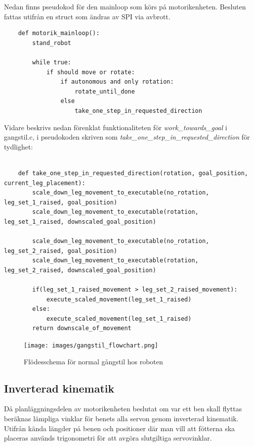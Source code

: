 \documentclass[a4paper,titlepage,12pt]{article}
\begin{document}
    	Nedan finns pseudokod för den mainloop som körs på motorikenheten. Besluten fattas utifrån en 
	struct som ändras av SPI via avbrott.

	\begin{lstlisting}
	def motorik_mainloop():
        stand_robot

        while true:
            if should move or rotate:
                if autonomous and only rotation:
                    rotate_until_done
                else
                    take_one_step_in_requested_direction
	\end{lstlisting}
	
    Vidare beskrivs nedan förenklat funktionaliteten för
    \textit{work\_towards\_goal} i gangstil.c, i pseudokoden skriven 
    som \textit{take\_one\_step\_in\_requested\_direction} för tydlighet:

	\begin{lstlisting}
	
	def take_one_step_in_requested_direction(rotation, goal_position, current_leg_placement):
		scale_down_leg_movement_to_executable(no_rotation, leg_set_1_raised, goal_position)
		scale_down_leg_movement_to_executable(rotation, leg_set_1_raised, downscaled_goal_position)

		scale_down_leg_movement_to_executable(no_rotation, leg_set_2_raised, goal_position)
		scale_down_leg_movement_to_executable(rotation, leg_set_2_raised, downscaled_goal_position)

		if(leg_set_1_raised_movement > leg_set_2_raised_movement):
			execute_scaled_movement(leg_set_1_raised)
		else:
			execute_scaled_movement(leg_set_1_raised)
		return downscale_of_movement
	\end{lstlisting}

	\begin{figure}[h]
		\centering
		\texttt{[image: images/gangstil\_flowchart.png]}
		\caption{Flödesschema för normal gångstil hos roboten
        \label{fig:walkflow0}}
	\end{figure}

	\subsection{Inverterad kinematik}
	\label{sub:inverterad-kinematik}
	Då planläggningsdelen av motorikenheten beslutat om var ett ben skall flyttas beräknas 
	lämpliga vinklar för benets alla servon genom inverterad kinematik. Utifrån kända 
	längder på benen och positioner där man vill att fötterna ska placeras används 
	trigonometri för att avgöra slutgiltiga servovinklar.
	
\end{document}
